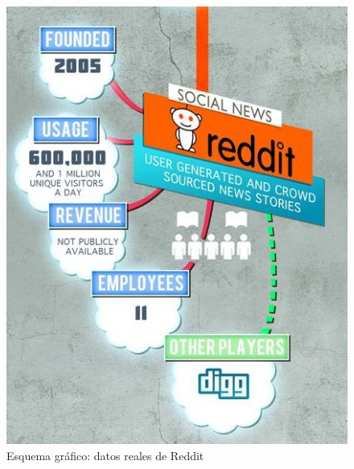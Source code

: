 ~

\begin{figure}[!h]
    \begin{center}
          \includegraphics[scale=0.4]{imagenes/im_2.jpg}
          \caption{Esquema gráfico: datos reales de Reddit}
          \label{fig:contra1}
    \end{center}
\end{figure}
\FloatBarrier